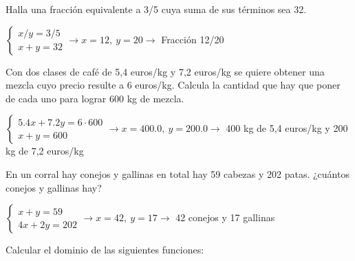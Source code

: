 \documentclass[spanish, 11pt]{exam}
\begin{document}
\begin{questions}
\question Halla una fracción equivalente a 3/5 cuya suma de sus términos sea 32.
\begin{solution} $\left\{\begin{matrix}x/y=3/5 \\ x+y=32\end{matrix}\right. \to  x = 12, \  y = 20 \to$ Fracción 12/20 \end{solution}

\question Con dos clases de café de 5,4 euros/kg y 7,2 euros/kg se quiere obtener una mezcla cuyo precio resulte a 6 euros/kg. Calcula la cantidad que hay que poner de cada uno para lograr 600 kg de mezcla.

\begin{solution} $\left\{\begin{matrix}5.4x+7.2y=6 \cdot 600 \\ x+y=600\end{matrix}\right. \to  x = 400.0, \  y = 200.0 \to$ 400 kg de 5,4 euros/kg y 200 kg de 7,2 euros/kg \end{solution}

\question En un corral hay conejos y gallinas en total hay 59 cabezas y 202 patas. ¿cuántos conejos y gallinas hay?
\begin{solution} $\left\{\begin{matrix}x+y=59 \\ 4x+2y=202\end{matrix}\right. \to  x = 42, \  y = 17 \to$ 42 conejos y 17 gallinas \end{solution}


\question Calcular el dominio de las siguientes funciones:
\begin{multicols}{2}
\begin{parts} 
\part[1] $f(x)=\frac{1}{x^2+2x+1}$ \begin{solution}$\left(-\infty, -1\right) \cup \left(-1, \infty\right)$\end{solution} 
\part[1] $f(x)=\sqrt{x^2+2x-2}$ \begin{solution} $\left(-\infty, - \sqrt{3} - 1\right] \cup \left[-1 + \sqrt{3}, \infty\right)$\end{solution} 
\part[1] $f(x)=\sqrt{\frac{x^2+x}{x-2}}$ \begin{solution} $\left[-1, 0\right] \cup \left(2, \infty\right)$\end{solution} 

\end{parts}
\end{multicols}
\end{questions}
\end{document}
